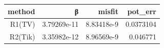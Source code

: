 \begin{tabular}{rrrr}
  \toprule
  \textbf{method} & \textbf{β} & \textbf{misfit} & \textbf{pot\_err} \\
  \midrule
  R1(TV) & 3.79269e-11 & 8.83418e-9 & 0.0373104 \\
  R2(Tik) & 3.35982e-12 & 8.96569e-9 & 0.046771 \\
  \bottomrule
\end{tabular}
